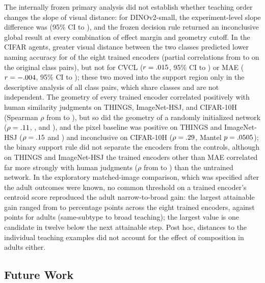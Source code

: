 \documentclass[11pt]{article}
\begin{document}
The internally frozen primary analysis did not establish whether teaching order changes the slope of visual distance: for DINOv2-small, the experiment-level slope difference was \VtOrdDelta{} (95\% CI \VtOrdLo{} to \VtOrdHi), and the frozen decision rule returned an inconclusive global result at every combination of effect margin and geometry cutoff. In the CIFAR agents, greater visual distance between the two classes predicted lower naming accuracy for \VtDSupportWord{} of the eight trained encoders (partial correlations from \VtDrMin{} to \VtDrMax{} on the \VtDN{} original class pairs), but not for CVCL ($r = .015$, 95\% CI \VtDCvclLo{} to \VtDCvclHi) or MAE ($r = -.004$, 95\% CI \VtDMaeLo{} to \VtDMaeHi); these two moved into the support region only in the descriptive analysis of all \VtDallN{} class pairs, which share classes and are not independent. The geometry of every trained encoder correlated positively with human similarity judgments on THINGS, ImageNet-HSJ, and CIFAR-10H (Spearman $\rho$ from \VtHoneMin{} to \VtHoneMax), but so did the geometry of a randomly initialized network ($\rho = .11$, \VtHoneRandHsj, and \VtHoneRandCten), and the pixel baseline was positive on THINGS and ImageNet-HSJ ($\rho = .15$ and \VtHonePixHsj) and inconclusive on CIFAR-10H ($\rho = .29$, Mantel $p = .0505$); the binary support rule did not separate the encoders from the controls, although on THINGS and ImageNet-HSJ the trained encoders other than MAE correlated far more strongly with human judgments ($\rho$ from \VcHoneTrMin{} to \VcHoneTrMax) than the untrained network. In the exploratory matched-image comparison, which was specified after the adult outcomes were known, no common threshold on a trained encoder's centroid score reproduced the adult narrow-to-broad gain: the largest attainable gain ranged from \VtXJumpMin{} to \VtXJumpMax{} percentage points across the eight trained encoders, against \VtXJumpAdult{} points for adults (same-subtype to broad teaching); the largest value is one candidate in twelve below the next attainable step. Post hoc, distances to the individual teaching examples did not account for the effect of composition in adults either.

\subsection{Future Work}
\end{document}
